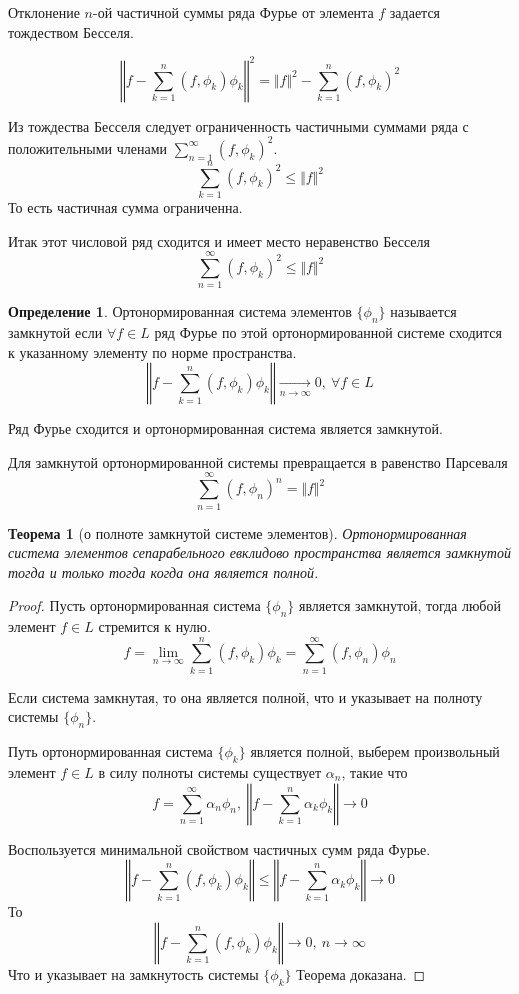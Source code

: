 \documentclass[14pt]{extarticle}
\newtheorem{theorem}{Теорема}[section]
\theoremstyle{definition}
\newtheorem{definition}{Определение}[section]
\theoremstyle{remark}
\renewcommand{\[}{\begin{dmath*}[compact]}
\renewcommand{\]}{\end{dmath*}}
\newcommand{\sep}{ , \ \allowbreak }
\begin{document}
Отклонение $n$-ой частичной суммы ряда Фурье от элемента $f$ задается
тождеством Бесселя.

\[\left \Vert f - \sum_{k=1}^n (f,\phi_k) \phi_k \right \Vert ^ 2
= \Vert f \Vert ^ 2 - \sum_{k=1}^n(f,\phi_k)^2 \]

Из тождества Бесселя следует ограниченность частичными
суммами ряда с положительными членами $\sum_{n=1}^\infty (f,\phi_k)^2$.
\[\sum_{k=1}^n (f,\phi_k)^2 \leq \Vert f \Vert ^2 \]
То есть частичная сумма ограниченна.

Итак этот числовой ряд сходится и имеет место неравенство Бесселя
\[\sum_{n=1}^\infty (f,\phi_k)^2 \leq \Vert f \Vert ^2\]

\begin{definition}
  Ортонормированная система элементов $\{\phi_n\}$ называется замкнутой если
  $\forall f \in L$ ряд Фурье по этой ортонормированной системе сходится
  к указанному элементу по норме пространства.
  \[\left \Vert f - \sum_{k=1}^n (f,\phi_k) \phi_k \right \Vert
  \xrightarrow[n \to \infty]{} 0 \sep \forall f\in L\]
\end{definition}

Ряд Фурье сходится и ортонормированная система является замкнутой.

Для замкнутой ортонормированной системы превращается в равенство Парсеваля
\[\sum_{n=1}^\infty (f, \phi_n)^n = \Vert f \Vert ^2\]

\begin{theorem}[о полноте замкнутой системе элементов]
  Ортонормированная система элементов сепарабельного евклидово пространства
  является замкнутой тогда и только тогда когда она является полной.
\end{theorem}

\begin{proof}
Пусть ортонормированная система $\{\phi_n\}$ является замкнутой,
тогда любой элемент $f \in L$ стремится к нулю.
\[f = \lim_{n \to \infty} \sum_{k=1}^n (f, \phi_k) \phi_k
= \sum_{n=1}^\infty (f,\phi_n) \phi_n\]

Если система замкнутая, то она является полной,
что и указывает на полноту системы $\{\phi_n\}$.

Путь ортонормированная система $\{\phi_k\}$ является полной,
выберем произвольный элемент $f \in L$ в силу полноты системы
существует $\alpha_n$, такие что
\[f = \sum_{n=1}^\infty \alpha_n \phi_n \sep
\left \Vert f - \sum_{k=1}^n \alpha_k \phi_k \right \Vert \to 0 \]

Воспользуется минимальной свойством частичных сумм ряда Фурье.
\[ \left\Vert f - \sum_{k=1}^n (f,\phi_k) \phi_k \right\Vert
\leq \left\Vert f - \sum_{k=1}^n \alpha_k \phi_k \right\Vert \to 0 \]
То
\[\left\Vert f - \sum_{k=1}^n (f,\phi_k) \phi_k \right\Vert \to 0 \sep
{n \to \infty}\]
Что и указывает на замкнутость системы $\{\phi_k\}$
Теорема доказана.
\end{proof}
\end{document}
